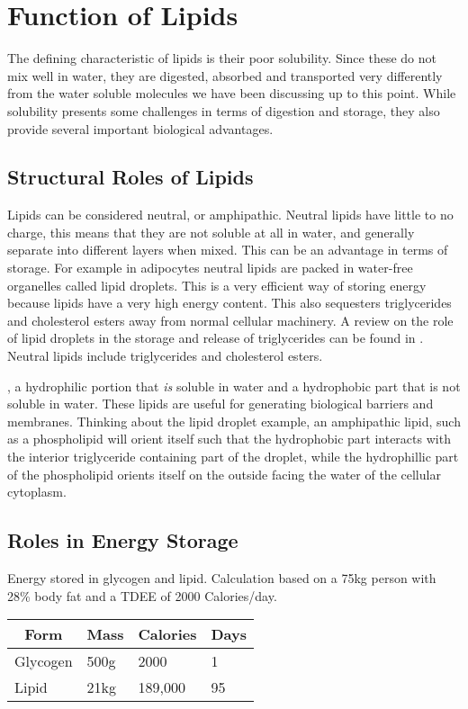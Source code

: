 \documentclass{tufte-handout}
\begin{document}
\section{Function of Lipids}

The defining characteristic of lipids is their poor solubility.  Since these do not mix well in water, they are digested, absorbed and transported very differently from the water soluble molecules we have been discussing up to this point.  While solubility presents some challenges in terms of digestion and storage, they also provide several important biological advantages.

\subsection{Structural Roles of Lipids}

Lipids can be considered neutral, or amphipathic.  Neutral lipids have little to no charge, this means that they are not soluble at all in water, and generally separate into different layers when mixed.  This can be an advantage in terms of storage.  For example in adipocytes neutral lipids are packed in water-free organelles called lipid droplets.  This is a very efficient way of storing energy because lipids have a very high energy content.  This also sequesters triglycerides  and cholesterol esters away from normal cellular machinery.  A review on the role of lipid droplets in the storage and release of triglycerides can be found in \citet{Walther2009}.  Neutral lipids include triglycerides and cholesterol esters.  

, a hydrophilic portion that \emph{is} soluble in water and a hydrophobic part that is not soluble in water.  These lipids are useful for generating biological barriers and membranes.  Thinking about the lipid droplet example, an amphipathic lipid, such as a phospholipid will orient itself such that the hydrophobic part interacts with the interior triglyceride containing part of the droplet, while the hydrophillic part of the phospholipid orients itself on the outside facing the water of the cellular cytoplasm.  

\subsection{Roles in Energy Storage}

\begin{margintable}
\centering
\caption{Energy stored in glycogen and lipid.  Calculation based on a 75kg person with 28\% body fat and a TDEE of 2000 Calories/day.}
\label{tab:macromolecule-storage}
\begin{tabular}{llll}
\hline
\multicolumn{1}{c}{\textbf{Form}} & \textbf{Mass} & \textbf{Calories} & \textbf{Days} \\ \hline
Glycogen & 500g & 2000 & 1 \\
Lipid & 21kg & 189,000 & 95 \\
\end{tabular}
\end{margintable}
\end{document}
